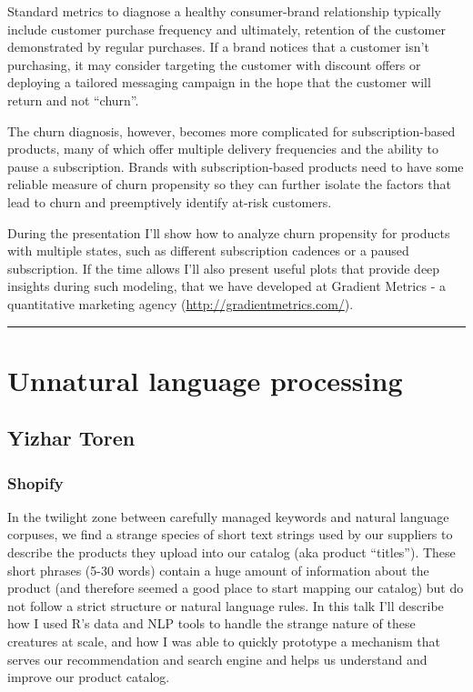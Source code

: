 \documentclass [12pt]{article}
\begin{document}
Standard metrics to diagnose a healthy consumer-brand relationship typically include customer purchase frequency and ultimately, retention of the customer demonstrated by regular purchases. If a brand notices that a customer isn’t purchasing, it may consider targeting the customer with discount offers or deploying a tailored messaging campaign in the hope that the customer will return and not “churn”.

The churn diagnosis, however, becomes more complicated for subscription-based products, many of which offer multiple delivery frequencies and the ability to pause a subscription. Brands with subscription-based products need to have some reliable measure of churn propensity so they can further isolate the factors that lead to churn and preemptively identify at-risk customers.

During the presentation I’ll show how to analyze churn propensity for products with multiple states, such as different subscription cadences or a paused subscription. If the time allows I’ll also present useful plots that provide deep insights during such modeling, that we have developed at Gradient Metrics - a quantitative marketing agency (\url{http://gradientmetrics.com/}).

\noindent\rule{\textwidth}{1pt}
\section{Unnatural language processing}
\subsection*{Yizhar	Toren}
\subsubsection*{Shopify}

In the twilight zone between carefully managed keywords and natural language corpuses, we find a strange species of short text strings used by our suppliers to describe the products they upload into our catalog (aka product “titles”). These short phrases (5-30 words) contain a huge amount of information about the product (and therefore seemed a good place to start mapping our catalog) but do not follow a strict structure or natural language rules. In this talk I'll describe how I used R's data and NLP tools to handle the strange nature of these creatures at scale, and how I was able to quickly prototype a mechanism that serves our recommendation and search engine and helps us understand and improve our product catalog.
\end{document}
